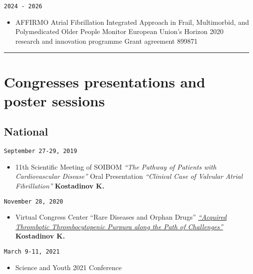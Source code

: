 \documentclass[
  12pt,
  letterpaper,
  DIV=11,
  numbers=noendperiod]{scrartcl}
\providecommand{\tightlist}{%
  \setlength{\itemsep}{0pt}\setlength{\parskip}{0pt}}\usepackage{longtable,booktabs,array}
\begin{document}
\texttt{2024\ -\ 2026}

\begin{itemize}
\tightlist
\item
  AFFIRMO \textbar{} Atrial Fibrillation Integrated Approach in Frail,
  Multimorbid, and Polymedicated Older People \textbar{} Monitor
  \textbar{} European Union's Horizon 2020 research and innovation
  programme \textbar{} Grant agreement 899871
\end{itemize}

\begin{center}\rule{0.5\linewidth}{0.5pt}\end{center}

\section{Congresses presentations and poster
sessions}\label{congresses-presentations-and-poster-sessions}

\subsection{National}\label{national-1}

\texttt{September\ 27-29,\ 2019}

\begin{itemize}
\tightlist
\item
  11th Scientific Meeting of SOIBOM \textbar{} \emph{``The Pathway of
  Patients with Cardiovascular Disease''} \textbar{} Oral Presentation
  \textbar{} \emph{``Clinical Case of Valvular Atrial Fibrillation''}
  \textbar{} \textbf{Kostadinov K.}
\end{itemize}

\texttt{November\ 28,\ 2020}

\begin{itemize}
\tightlist
\item
  Virtual Congress Center ``Rare Diseases and Orphan Drugs'' \textbar{}
  \href{https://youtu.be/R_UbvDcyTxs}{\emph{``Acquired Thrombotic
  Thrombocytopenic Purpura along the Path of Challenges''}} \textbar{}
  \textbf{Kostadinov K.}
\end{itemize}

\texttt{March\ 9-11,\ 2021}

\begin{itemize}
\tightlist
\item
  Science and Youth 2021 Conference
\end{itemize}
\end{document}
